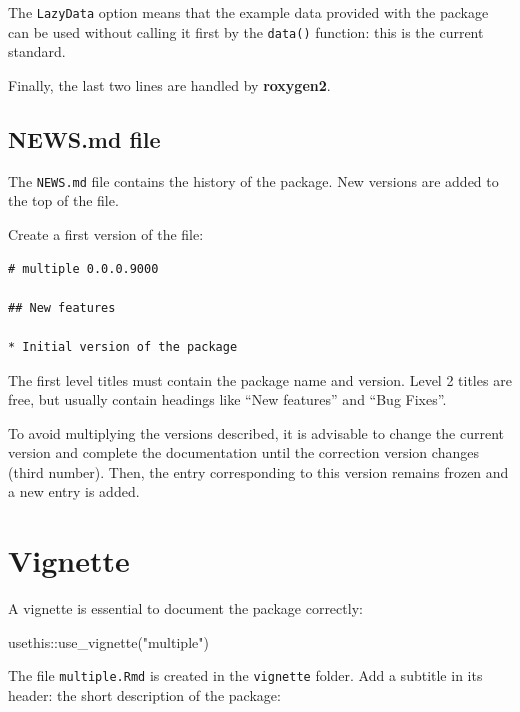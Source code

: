 \documentclass[
  12pt,
  american,
  a4paper,
  extrafontsizes,onecolumn,openright
  ]{memoir}
\newenvironment{Shaded}{\begin{snugshade}}{\end{snugshade}}
\newcommand{\FunctionTok}[1]{\textcolor[rgb]{0.00,0.00,0.00}{#1}}
\newcommand{\NormalTok}[1]{#1}
\newcommand{\SpecialCharTok}[1]{\textcolor[rgb]{0.00,0.00,0.00}{#1}}
\newcommand{\StringTok}[1]{\textcolor[rgb]{0.31,0.60,0.02}{#1}}
\begin{document}
The \texttt{LazyData} option means that the example data provided with the package can be used without calling it first by the \texttt{data()} function: this is the current standard.

Finally, the last two lines are handled by \textbf{roxygen2}.

\hypertarget{news.md-file}{%
\subsection{NEWS.md file}\label{news.md-file}}

The \texttt{NEWS.md} file contains the history of the package.
New versions are added to the top of the file.

Create a first version of the file:

\begin{verbatim}
# multiple 0.0.0.9000

## New features

* Initial version of the package
\end{verbatim}

The first level titles must contain the package name and version.
Level 2 titles are free, but usually contain headings like \enquote{New features} and \enquote{Bug Fixes}.

To avoid multiplying the versions described, it is advisable to change the current version and complete the documentation until the correction version changes (third number).
Then, the entry corresponding to this version remains frozen and a new entry is added.

\hypertarget{vignette}{%
\section{Vignette}\label{vignette}}

A vignette is essential to document the package correctly:

\scriptsize

\begin{Shaded}
\begin{Highlighting}[]
\NormalTok{usethis}\SpecialCharTok{::}\FunctionTok{use\_vignette}\NormalTok{(}\StringTok{"multiple"}\NormalTok{)}
\end{Highlighting}
\end{Shaded}

\normalsize

The file \texttt{multiple.Rmd} is created in the \texttt{vignette} folder.
Add a subtitle in its header: the short description of the package:
\end{document}
